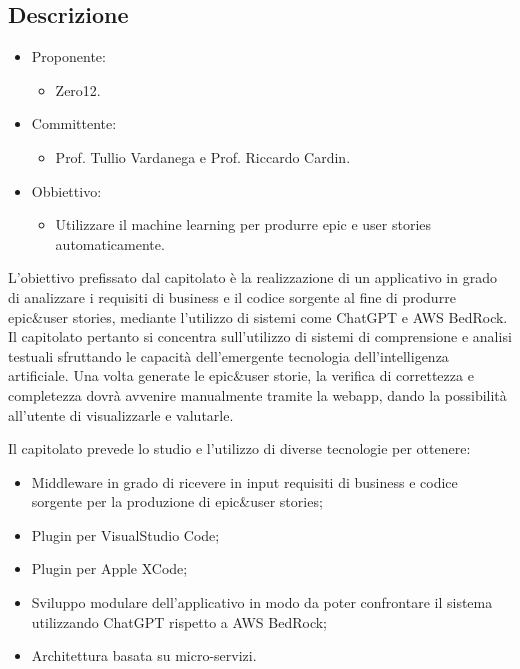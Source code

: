 \documentclass[a4paper, twoside]{article}
\begin{document}
    \subsection{Descrizione}
        \begin{itemize}
            \item Proponente:
            \begin{itemize}
                \item Zero12.
            \end{itemize}

            \item Committente:
            \begin{itemize}
                \item Prof. Tullio Vardanega e Prof. Riccardo Cardin.
            \end{itemize}

            \item Obbiettivo:
            \begin{itemize}
                \item Utilizzare il machine learning per produrre epic e user stories automaticamente.
            \end{itemize}

        \end{itemize}
    L'obiettivo prefissato dal capitolato è la realizzazione di un applicativo in grado di analizzare i requisiti di business e il codice
    sorgente al fine di produrre epic\&user stories, mediante l'utilizzo di sistemi come ChatGPT e AWS BedRock.
    Il capitolato pertanto si concentra sull'utilizzo di sistemi di comprensione e analisi testuali sfruttando le capacità dell'emergente
    tecnologia dell'intelligenza artificiale.
    Una volta generate le epic\&user storie, la verifica di correttezza e completezza dovrà avvenire manualmente tramite la webapp, dando la possibilità
    all'utente di visualizzarle e valutarle.

    Il capitolato prevede lo studio e l'utilizzo di diverse tecnologie per ottenere:
    \begin{itemize}
        \item Middleware in grado di ricevere in input requisiti di business e codice sorgente per la produzione di epic\&user stories;
        \item Plugin per VisualStudio Code;
        \item Plugin per Apple XCode;
        \item Sviluppo modulare dell'applicativo in modo da poter confrontare il sistema utilizzando ChatGPT rispetto a AWS BedRock;
        \item Architettura basata su micro-servizi.
    \end{itemize}
\end{document}
